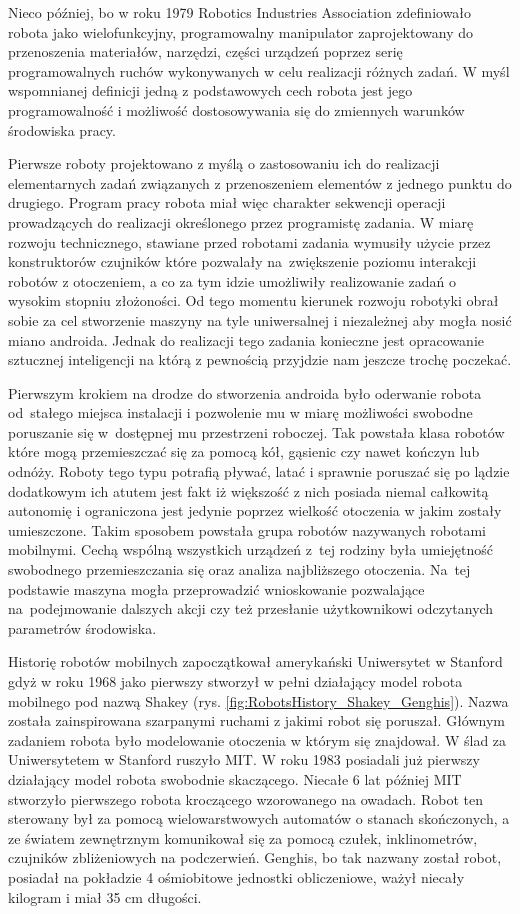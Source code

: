 Nieco później, bo w roku 1979 Robotics Industries Association zdefiniowało robota
jako wielofunkcyjny, programowalny manipulator zaprojektowany do przenoszenia
materiałów, narzędzi, części urządzeń poprzez serię programowalnych ruchów
wykonywanych w celu realizacji różnych zadań. W myśl wspomnianej definicji jedną
z podstawowych cech robota jest jego programowalność i możliwość dostosowywania
się do zmiennych warunków środowiska pracy.

Pierwsze roboty projektowano z myślą o zastosowaniu ich do realizacji
elementarnych zadań związanych z przenoszeniem elementów z jednego punktu do
drugiego. Program pracy robota miał więc charakter sekwencji operacji
prowadzących do realizacji określonego przez programistę zadania. W miarę rozwoju
technicznego, stawiane przed robotami zadania wymusiły użycie przez konstruktorów
czujników które pozwalały na~zwiększenie poziomu interakcji robotów z otoczeniem,
a co za tym idzie umożliwiły realizowanie zadań o wysokim stopniu złożoności. Od
tego momentu kierunek rozwoju robotyki obrał sobie za cel stworzenie maszyny na
tyle uniwersalnej i niezależnej aby mogła nosić miano androida. Jednak do
realizacji tego zadania konieczne jest opracowanie sztucznej inteligencji na
którą z pewnością przyjdzie nam jeszcze trochę poczekać.

Pierwszym krokiem na drodze do stworzenia androida było oderwanie robota
od~stałego miejsca instalacji i pozwolenie mu w miarę możliwości swobodne
poruszanie się w~dostępnej mu przestrzeni roboczej. Tak powstała klasa robotów
które mogą przemieszczać się za pomocą kół, gąsienic czy nawet kończyn lub
odnóży. Roboty tego typu potrafią pływać, latać i sprawnie poruszać się po lądzie
dodatkowym ich atutem jest fakt iż większość z nich posiada niemal całkowitą
autonomię i ograniczona jest jedynie poprzez wielkość otoczenia w jakim zostały
umieszczone. Takim sposobem powstała grupa robotów nazywanych robotami mobilnymi.
Cechą wspólną wszystkich urządzeń z~tej rodziny była umiejętność swobodnego
przemieszczania się oraz analiza najbliższego otoczenia. Na~tej podstawie maszyna
mogła przeprowadzić wnioskowanie pozwalające na~podejmowanie dalszych akcji czy
też przesłanie użytkownikowi odczytanych parametrów środowiska.

Historię robotów mobilnych zapoczątkował amerykański Uniwersytet w Stanford gdyż
w roku 1968 jako pierwszy stworzył w pełni działający model robota mobilnego pod
nazwą Shakey (rys. \ref{fig:RobotsHistory_Shakey_Genghis}). Nazwa została
zainspirowana szarpanymi ruchami z jakimi robot się poruszał. Głównym zadaniem
robota było modelowanie otoczenia w którym się znajdował. W ślad za Uniwersytetem
w Stanford ruszyło MIT. W roku 1983 posiadali już pierwszy działający model
robota swobodnie skaczącego. Niecałe 6 lat później MIT stworzyło pierwszego
robota kroczącego wzorowanego na owadach. Robot ten sterowany był za pomocą
wielowarstwowych automatów o stanach skończonych, a ze światem zewnętrznym
komunikował się za pomocą czułek, inklinometrów, czujników zbliżeniowych na
podczerwień. Genghis, bo tak nazwany został robot, posiadał na pokładzie 4
ośmiobitowe jednostki obliczeniowe, ważył niecały kilogram i miał 35 cm długości.

